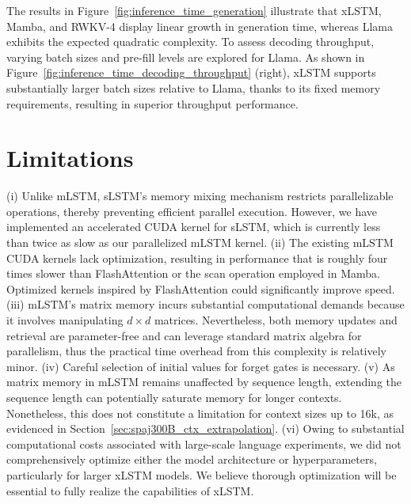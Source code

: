 The results in Figure~\ref{fig:inference_time_generation} illustrate that xLSTM, Mamba, and RWKV-4 display linear growth in generation time, whereas Llama exhibits the expected quadratic complexity. To assess decoding throughput, varying batch sizes and pre-fill levels are explored for Llama. As shown in Figure~\ref{fig:inference_time_decoding_throughput} (right), xLSTM supports substantially larger batch sizes relative to Llama, thanks to its fixed memory requirements, resulting in superior throughput performance.

\section{Limitations}

(i) Unlike mLSTM, sLSTM’s memory mixing mechanism restricts parallelizable operations, thereby preventing efficient parallel execution. However, we have implemented an accelerated CUDA kernel for sLSTM, which is currently less than twice as slow as our parallelized mLSTM kernel. (ii) The existing mLSTM CUDA kernels lack optimization, resulting in performance that is roughly four times slower than FlashAttention or the scan operation employed in Mamba. Optimized kernels inspired by FlashAttention could significantly improve speed. (iii) mLSTM’s matrix memory incurs substantial computational demands because it involves manipulating $d \times d$ matrices. Nevertheless, both memory updates and retrieval are parameter-free and can leverage standard matrix algebra for parallelism, thus the practical time overhead from this complexity is relatively minor. (iv) Careful selection of initial values for forget gates is necessary. (v) As matrix memory in mLSTM remains unaffected by sequence length, extending the sequence length can potentially saturate memory for longer contexts. Nonetheless, this does not constitute a limitation for context sizes up to 16k, as evidenced in Section~\ref{sec:spaj300B_ctx_extrapolation}. (vi) Owing to substantial computational costs associated with large-scale language experiments, we did not comprehensively optimize either the model architecture or hyperparameters, particularly for larger xLSTM models. We believe thorough optimization will be essential to fully realize the capabilities of xLSTM.


